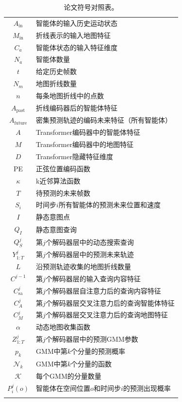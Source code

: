 \documentclass{article}
\begin{document}
\begin{table}[h]
\caption{论文符号对照表。}
\vspace{-2mm}
\label{tab:notations_lookup}
\begin{center}
\begin{tabular}{cl}
\Xhline{2\arrayrulewidth}
$A_{\text{in}}$  & 智能体的输入历史运动状态 \\
$M_{\text{in}}$ & 折线表示的输入地图特征\\
$C_a$ & 智能体状态的输入特征维度 \\
$N_a$    & 智能体数量 \\
$t$ & 给定历史帧数 \\ 
$N_m$ & 地图折线数量 \\
$n$ & 每条地图折线中的点数 \\
$A_{\text{past}}$ & 折线编码器后的智能体特征 \\
$A_{\text{future}}$ & 密集预测轨迹的编码未来特征（所有智能体）\\
$A$ & Transformer编码器中的智能体特征 \\
$M$ & Transformer编码器中的地图特征 \\
$D$ & Transformer隐藏特征维度 \\
PE & 正弦位置编码函数 \\ 
$\kappa$ & k近邻算法函数 \\ 
$T$ & 待预测的未来帧数 \\
$S_i$ & 时间步$i$所有智能体的预测未来位置和速度\\
$I$ & 静态意图点 \\
$Q_I$ & 静态意图查询\\
$Q_S^{j}$ & 第$j$个解码器层中的动态搜索查询 \\
$Y^j_{1:T}$ & 第$j$个解码器层中的预测未来轨迹 \\
$L$ & 沿预测轨迹收集的地图折线数量 \\
$C^{j-1}$ & 第$j$个解码器层的输入查询内容特征 \\ 
$C^j_{\text{sa}}$ & 第$j$个解码器层自注意力后的查询内容特征 \\ 
$C^j_A$ & 第$j$个解码器层交叉注意力后的查询智能体特征 \\
$C^j_M$ & 第$j$个解码器层交叉注意力后的查询地图特征\\
$\alpha$ & 动态地图收集函数\\
$Z^j_{1:T}$ & 第$j$个解码器层中的预测GMM参数 \\ 
$p_k$ & GMM中第$k$个分量的预测概率\\ 
$\mathcal{N}_k$ & GMM中第$k$个分量的函数\\ 
$\mathcal{K}$ & 每个GMM的分量数量\\ 
$P_i^j(o)$ & 智能体在空间位置$o$和时间步$i$的预测出现概率\\ 
\Xhline{2\arrayrulewidth}
\end{tabular}
\end{center}
\end{table}
    

	
\end{document}
